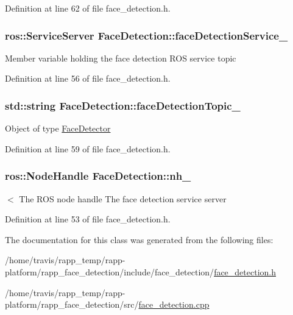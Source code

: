 Definition at line 62 of file face\-\_\-detection.\-h.

\hypertarget{classFaceDetection_a72874127ac52787483a3f1a744771eb7}{
\subsubsection[{face\-Detection\-Service\-\_\-}]{\setlength{\rightskip}{0pt plus 5cm}ros\-::\-Service\-Server Face\-Detection\-::face\-Detection\-Service\-\_\-\hspace{0.3cm}{\ttfamily [private]}}}\label{classFaceDetection_a72874127ac52787483a3f1a744771eb7}
Member variable holding the face detection R\-O\-S service topic 

Definition at line 56 of file face\-\_\-detection.\-h.

\hypertarget{classFaceDetection_a579ac45aa616167d12e25b7657c05af1}{
\subsubsection[{face\-Detection\-Topic\-\_\-}]{\setlength{\rightskip}{0pt plus 5cm}std\-::string Face\-Detection\-::face\-Detection\-Topic\-\_\-\hspace{0.3cm}{\ttfamily [private]}}}\label{classFaceDetection_a579ac45aa616167d12e25b7657c05af1}
Object of type \hyperlink{classFaceDetector}{Face\-Detector} 

Definition at line 59 of file face\-\_\-detection.\-h.

\hypertarget{classFaceDetection_a72f7ce4daf0768075f88c48db5957195}{
\subsubsection[{nh\-\_\-}]{\setlength{\rightskip}{0pt plus 5cm}ros\-::\-Node\-Handle Face\-Detection\-::nh\-\_\-\hspace{0.3cm}{\ttfamily [private]}}}\label{classFaceDetection_a72f7ce4daf0768075f88c48db5957195}
$<$ The R\-O\-S node handle The face detection service server 

Definition at line 53 of file face\-\_\-detection.\-h.



The documentation for this class was generated from the following files\-:\begin{DoxyCompactItemize}
\item 
/home/travis/rapp\-\_\-temp/rapp-\/platform/rapp\-\_\-face\-\_\-detection/include/face\-\_\-detection/\hyperlink{face__detection_8h}{face\-\_\-detection.\-h}\item 
/home/travis/rapp\-\_\-temp/rapp-\/platform/rapp\-\_\-face\-\_\-detection/src/\hyperlink{face__detection_8cpp}{face\-\_\-detection.\-cpp}\end{DoxyCompactItemize}
